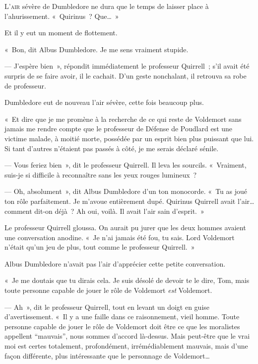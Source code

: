 
\lettrine{L}{'air} sévère de Dumbledore ne dura que le temps de laisser place à l'ahurissement. «~Quirinus~? Que…~»

Et il y eut un moment de flottement.

«~Bon, dit Albus Dumbledore. Je me sens vraiment stupide.

--- J'espère bien~», répondit immédiatement le professeur Quirrell~; s'il avait été surpris de se faire avoir, il le cachait. D'un geste nonchalant, il retrouva sa robe de professeur.

Dumbledore eut de nouveau l'air sévère, cette fois beaucoup plus.

«~Et dire que je me promène à la recherche de ce qui reste de Voldemort sans jamais me rendre compte que le professeur de Défense de Poudlard est une victime malade, à moitié morte, possédée par un esprit bien plus puissant que lui. Si tant d'autres n'étaient pas passés à côté, je me serais déclaré sénile.

--- Vous feriez bien~», dit le professeur Quirrell. Il leva les sourcils. «~Vraiment, suis-je si difficile à reconnaître sans les yeux rouges lumineux~?

--- Oh, absolument~», dit Albus Dumbledore d'un ton monocorde. «~Tu as joué ton rôle parfaitement. Je m'avoue entièrement dupé. Quirinus Quirrell avait l'air… comment dit-on déjà~? Ah oui, voilà. Il avait l'air sain d'esprit.~»

Le professeur Quirrell gloussa. On aurait pu jurer que les deux hommes avaient une conversation anodine. «~Je n'ai jamais été fou, tu sais. Lord Voldemort n'était qu'un jeu de plus, tout comme le professeur Quirrell.~»

Albus Dumbledore n'avait pas l'air d'apprécier cette petite conversation.

«~Je me doutais que tu dirais cela. Je suis désolé de devoir te le dire, Tom, mais toute personne capable de jouer le rôle de Voldemort \emph{est} Voldemort.

--- Ah~», dit le professeur Quirrell, tout en levant un doigt en guise d'avertissement. «~Il y a une faille dans ce raisonnement, vieil homme. Toute personne capable de jouer le rôle de Voldemort doit être ce que les moralistes appellent “mauvais”, nous sommes d'accord là-dessus. Mais peut-être que le vrai moi est certes totalement, profondément, irrémédiablement mauvais, mais d'une façon différente, plus intéressante que le personnage de Voldemort…

